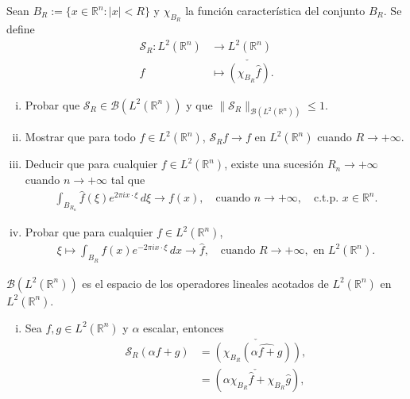 \begin{homeworkProblem}
  Sean $B_R := \{x \in \mathbb{R}^n : |x| < R\}$ y $\chi_{B_R}$ la función característica del conjunto $B_R$. Se define
  \begin{align*}
    \mathcal{S}_{R}:L^2(\mathbb{R}^n) &\longrightarrow L^2(\mathbb{R}^n)\\
    f &\longmapsto \check{\left(\chi_{B_R} \hat{f} \right)}.   
  \end{align*}
  \begin{enumerate}[(i)]
    \item Probar que $\mathcal{S}_{R} \in \mathcal{B}(L^2(\mathbb{R}^n))$ y que $\|\mathcal{S}_{R}\|_{\mathcal{B}(L^2(\mathbb{R}^n))} \leq 1$.
    \item Mostrar que para todo $f \in L^2(\mathbb{R}^n)$, $\mathcal{S}_R f \to f$ en $L^2(\mathbb{R}^n)$ cuando $R \to +\infty$.
    \item Deducir que para cualquier $f \in L^2(\mathbb{R}^n)$, existe una sucesión $R_n \to +\infty$ cuando $n \to +\infty$ tal que
      \begin{align*}
        \int_{B_{R_n}} \widehat{f}(\xi) e^{2\pi i x \cdot \xi} \, d\xi \longrightarrow f(x), \quad \text{cuando } n \to +\infty, \quad \text{c.t.p. } x \in \mathbb{R}^n.
      \end{align*}
    \item Probar que para cualquier $f \in L^2(\mathbb{R}^n)$,
      \begin{align*}
        \xi \longmapsto \int_{B_R} f(x) e^{-2\pi i x \cdot \xi} \, dx \longrightarrow \hat{f}, \quad \text{cuando } R \to +\infty, \text{ en } L^2(\mathbb{R}^n).
      \end{align*}
  \end{enumerate}
  \begin{solution}
    \begin{note}{}
      $\mathcal{B}(L^2(\mathbb{R}^{n}))$ es el espacio de los operadores lineales acotados de $L^2(\mathbb{R}^{n})$ en $L^2(\mathbb{R}^{n})$.  
    \end{note}
    \begin{enumerate}[(i)]
      \item Sea $f,g\in L^2(\mathbb{R}^{n})$ y $\alpha$ escalar, entonces
        \begin{align*}
          \mathcal{S}_{R}\left( \alpha f+g \right)&=\check{\left( \chi_{B_{R}}(\hat{\alpha f+g}) \right)},\\
          &= \left( \check{\alpha\chi_{B_{R}}\hat{f}+\chi_{B_{R}}\hat{g}} \right),\\

\end{align*}
\end{enumerate}
\end{solution}
\end{homeworkProblem}
